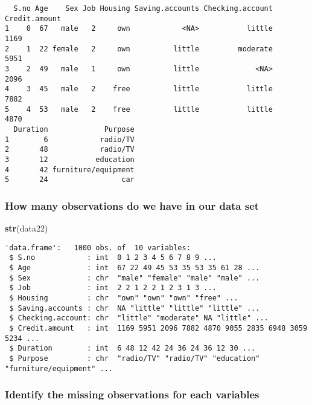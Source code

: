 \documentclass[
]{article}
\newenvironment{Shaded}{\begin{snugshade}}{\end{snugshade}}
\newcommand{\FunctionTok}[1]{\textcolor[rgb]{0.13,0.29,0.53}{\textbf{#1}}}
\newcommand{\NormalTok}[1]{#1}
\begin{document}
\begin{verbatim}
  S.no Age    Sex Job Housing Saving.accounts Checking.account Credit.amount
1    0  67   male   2     own            <NA>           little          1169
2    1  22 female   2     own          little         moderate          5951
3    2  49   male   1     own          little             <NA>          2096
4    3  45   male   2    free          little           little          7882
5    4  53   male   2    free          little           little          4870
  Duration             Purpose
1        6            radio/TV
2       48            radio/TV
3       12           education
4       42 furniture/equipment
5       24                 car
\end{verbatim}

\hypertarget{how-many-observations-do-we-have-in-our-data-set}{%
\subsubsection{How many observations do we have in our data
set}\label{how-many-observations-do-we-have-in-our-data-set}}

\begin{Shaded}
\begin{Highlighting}[]
\FunctionTok{str}\NormalTok{(data22)}
\end{Highlighting}
\end{Shaded}

\begin{verbatim}
'data.frame':   1000 obs. of  10 variables:
 $ S.no            : int  0 1 2 3 4 5 6 7 8 9 ...
 $ Age             : int  67 22 49 45 53 35 53 35 61 28 ...
 $ Sex             : chr  "male" "female" "male" "male" ...
 $ Job             : int  2 2 1 2 2 1 2 3 1 3 ...
 $ Housing         : chr  "own" "own" "own" "free" ...
 $ Saving.accounts : chr  NA "little" "little" "little" ...
 $ Checking.account: chr  "little" "moderate" NA "little" ...
 $ Credit.amount   : int  1169 5951 2096 7882 4870 9055 2835 6948 3059 5234 ...
 $ Duration        : int  6 48 12 42 24 36 24 36 12 30 ...
 $ Purpose         : chr  "radio/TV" "radio/TV" "education" "furniture/equipment" ...
\end{verbatim}

\hypertarget{identify-the-missing-observations-for-each-variables}{%
\subsubsection{Identify the missing observations for each
variables}\label{identify-the-missing-observations-for-each-variables}}
\end{document}
